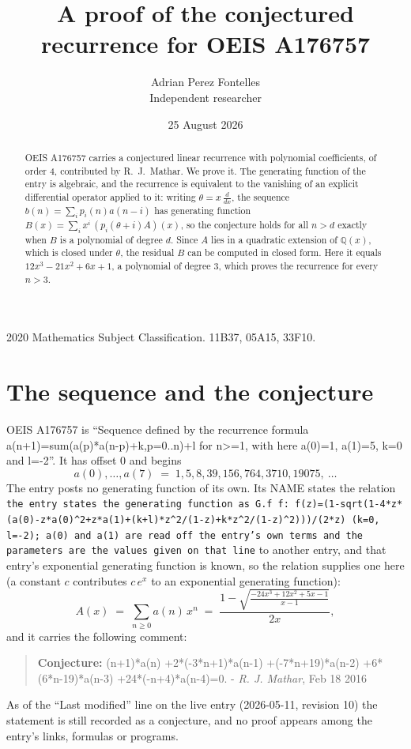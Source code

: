 \documentclass[11pt,a4paper]{article}
\title{A proof of the conjectured recurrence for OEIS A176757}
\author{Adrian Perez Fontelles\\ \small Independent researcher}
\date{25 August 2026}
\theoremstyle{plain}
\theoremstyle{definition}
\begin{document}
\maketitle

\begin{abstract}
OEIS A176757 carries a conjectured linear recurrence with polynomial coefficients, of
order 4, contributed by R.~J.~Mathar. We prove it. The generating function of the
entry is algebraic, and the recurrence is equivalent to the vanishing of an explicit
differential operator applied to it: writing $\theta=x\,\frac{d}{dx}$, the sequence
$b(n)=\sum_{i}p_{i}(n)a(n-i)$ has generating function
$B(x)=\sum_{i}x^{i}\,(p_{i}(\theta+i)A)(x)$, so the conjecture holds for all $n>d$ exactly
when $B$ is a polynomial of degree $d$. Since $A$ lies in a quadratic extension of
$\mathbb{Q}(x)$, which is closed under $\theta$, the residual $B$ can be computed in
closed form. Here it equals $12 x^{3} - 21 x^{2} + 6 x + 1$, a polynomial of degree $3$, which proves
the recurrence for every $n>3$.
\end{abstract}

\noindent\small 2020 Mathematics Subject Classification. 11B37, 05A15, 33F10.\normalsize

\section{The sequence and the conjecture}

OEIS A176757 is ``Sequence defined by the recurrence formula a(n+1)=sum(a(p)*a(n-p)+k,p=0..n)+l for n>=1, with here a(0)=1, a(1)=5, k=0 and l=-2''. It has offset $0$ and begins
\[
a(0),\dots,a(7)\;=\;1, 5, 8, 39, 156, 764, 3710, 19075,\ \dots
\]
The entry posts no generating function of its own. Its NAME states the
relation \texttt{the entry states the generating function as G.f f: f(z)=(1-sqrt(1-4*z*(a(0)-z*a(0)\textasciicircum{}2+z*a(1)+(k+l)*z\textasciicircum{}2/(1-z)+k*z\textasciicircum{}2/(1-z)\textasciicircum{}2)))/(2*z) (k=0, l=-2); a(0) and a(1) are read off the entry's own terms and the parameters are the values given on that line} to another entry, and that entry's exponential generating
function is known, so the relation supplies one here (a constant $c$ contributes
$c\,e^{x}$ to an exponential generating function):
\begin{equation}\label{eq:gf}
A(x)\;=\;\sum_{n\ge 0} a(n)\,x^{n}\;=\;\frac{1 - \sqrt{\frac{- 24 x^{3} + 12 x^{2} + 5 x - 1}{x - 1}}}{2 x} ,
\end{equation}
and it carries the following comment:
\begin{quote}\small
\textbf{Conjecture:} (n+1)*a(n) +2*(-3*n+1)*a(n-1) +(-7*n+19)*a(n-2) +6*(6*n-19)*a(n-3) +24*(-n+4)*a(n-4)=0. - \emph{R. J. Mathar}, Feb 18 2016
\end{quote}
As of the ``Last modified'' line on the live entry (2026-05-11, revision 10) the
statement is still recorded as a conjecture, and no proof appears among the entry's links,
formulas or programs.
\end{document}
